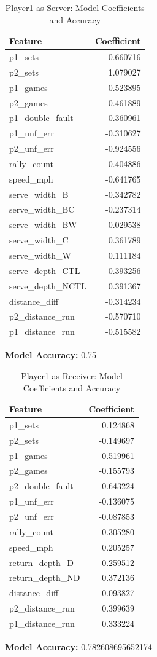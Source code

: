 \documentclass[12pt]{article}  %
\begin{document}
\begin{table}[ht]
\centering
\caption{Player1 as Server: Model Coefficients and Accuracy}
\begin{tabularx}{\textwidth}{@{}Xr@{}}
\toprule
Feature & Coefficient \\
\midrule
p1\_sets & -0.660716 \\
p2\_sets & 1.079027 \\
p1\_games & 0.523895 \\
p2\_games & -0.461889 \\
p1\_double\_fault & 0.360961 \\
p1\_unf\_err & -0.310627 \\
p2\_unf\_err & -0.924556 \\
rally\_count & 0.404886 \\
speed\_mph & -0.641765 \\
serve\_width\_B & -0.342782 \\
serve\_width\_BC & -0.237314 \\
serve\_width\_BW & -0.029538 \\
serve\_width\_C & 0.361789 \\
serve\_width\_W & 0.111184 \\
serve\_depth\_CTL & -0.393256 \\
serve\_depth\_NCTL & 0.391367 \\
distance\_diff & -0.314234 \\
p2\_distance\_run & -0.570710 \\
p1\_distance\_run & -0.515582 \\
\bottomrule
\end{tabularx}
\textbf{Model Accuracy:} 0.75
\end{table}

\begin{table}[ht]
\centering
\caption{Player1 as Receiver: Model Coefficients and Accuracy}
\begin{tabularx}{\textwidth}{@{}Xr@{}}
\toprule
Feature & Coefficient \\
\midrule
p1\_sets & 0.124868 \\
p2\_sets & -0.149697 \\
p1\_games & 0.519961 \\
p2\_games & -0.155793 \\
p2\_double\_fault & 0.643224 \\
p1\_unf\_err & -0.136075 \\
p2\_unf\_err & -0.087853 \\
rally\_count & -0.305280 \\
speed\_mph & 0.205257 \\
return\_depth\_D & 0.259512 \\
return\_depth\_ND & 0.372136 \\
distance\_diff & -0.093827 \\
p2\_distance\_run & 0.399639 \\
p1\_distance\_run & 0.333224 \\
\bottomrule
\end{tabularx}
\textbf{Model Accuracy:} 0.782608695652174
\end{table}
\end{document}
